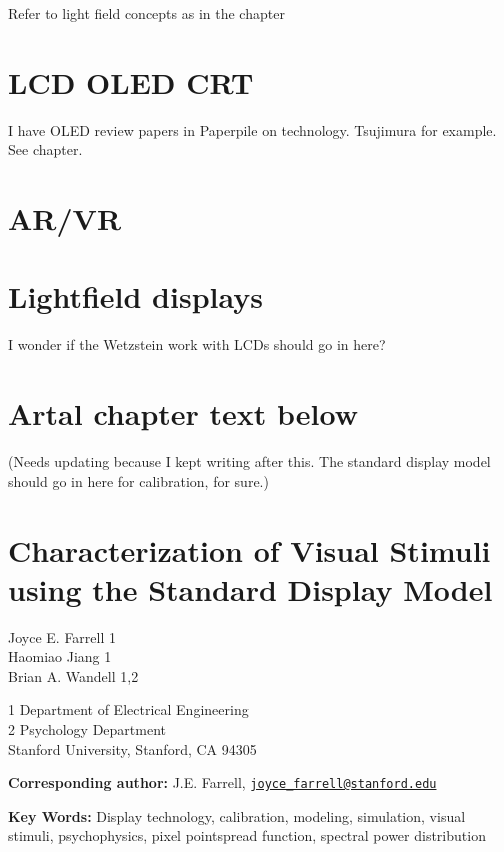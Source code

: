 \documentclass[
  letterpaper,
]{book}
\begin{document}
Refer to light field concepts as in the chapter

\section{LCD OLED CRT}\label{lcd-oled-crt}

I have OLED review papers in Paperpile on technology. Tsujimura for
example. See chapter.

\section{AR/VR}\label{arvr}

\section{Lightfield displays}\label{lightfield-displays}

I wonder if the Wetzstein work with LCDs should go in here?

\section{Artal chapter text below}\label{artal-chapter-text-below}

(Needs updating because I kept writing after this. The standard display
model should go in here for calibration, for sure.)

\section{Characterization of Visual Stimuli using the Standard Display
Model}\label{characterization-of-visual-stimuli-using-the-standard-display-model}

Joyce E. Farrell 1\\
Haomiao Jiang 1\\
Brian A. Wandell 1,2

1 Department of Electrical Engineering\\
2 Psychology Department\\
Stanford University, Stanford, CA 94305

\textbf{Corresponding author:} J.E. Farrell,
\href{mailto:joyce_farrell@stanford.edu}{\nolinkurl{joyce\_farrell@stanford.edu}}

\textbf{Key Words:} Display technology, calibration, modeling,
simulation, visual stimuli, psychophysics, pixel pointspread function,
spectral power distribution
\end{document}
